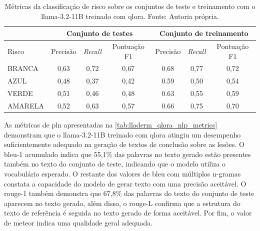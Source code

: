 \begin{table}[ht]
    \centering
    \begin{tabular}{l|c|c|c|c|c|c}
        \hline
                        & \multicolumn{3}{c|}{Conjunto de testes} & \multicolumn{3}{c}{Conjunto de treinamento}
        \\ \hline
        Risco           & Precisão                                & \textit{Recall}
                        & Pontuação F1                            & Precisão
                        &
        \textit{Recall} & Pontuação F1
        \\ \hline
        BRANCA          & 0,63                                    & 0,72
                        & 0,67                                    & 0.68                                        & 0,77
                        & 0,72
        \\
        AZUL            & 0,48                                    & 0,37
                        & 0,42                                    & 0.59                                        & 0,50
                        & 0,54
        \\
        VERDE           & 0,51                                    & 0,46
                        & 0,48                                    & 0.63                                        & 0,55
                        & 0,59
        \\
        AMARELA         & 0,52                                    & 0,63
                        & 0,57                                    & 0.66                                        & 0,75
                        & 0,70
        \\ \hline
    \end{tabular}
    \label{tab:lladerm_qlora_risk_classification_report}
    \caption{Métricas da classificação de risco sobre os conjuntos de teste e treinamento com o
    \ac{llama}-3.2-11B treinado com \ac{qlora}. Fonte: Autoria própria.}
\end{table}

As métricas de \ac{pln} apresentadas na \autoref{tab:lladerm_qlora_nlp_metrics} demonstram que o \ac{llama}-3.2-11B
treinado com \ac{qlora} atingiu um desempenho suficientemente adequado na geração de textos de conclusão sobre as
lesões. O \ac{bleu}-1 acumulado indica que 55,1\% das palavras no texto gerado estão presentes também no texto do
conjunto de teste, indicando que o modelo utiliza o vocabulário esperado. O restante dos valores de \ac{bleu} com
múltiplos n-gramas constata a capacidade do modelo de gerar texto com uma precisão aceitável. O \ac{rouge}-1 também
demonstra que 67,8\% das palavras do texto do conjunto de teste aparecem no texto gerado, além disso, o \ac{rouge}-L
confirma que a estrutura do texto de referência é seguida no texto gerado de forma aceitável. Por fim, o valor de
\ac{meteor} indica uma qualidade geral adequada.

